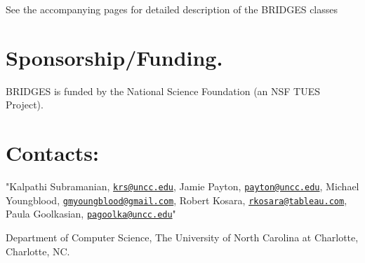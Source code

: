 See the accompanying pages for detailed description of the B\+R\+I\+D\+G\+ES classes \hypertarget{index_sponsor_sec}{}\section{Sponsorship/\+Funding.}\label{index_sponsor_sec}
B\+R\+I\+D\+G\+ES is funded by the National Science Foundation (an N\+SF T\+U\+ES Project).\hypertarget{index_contacts_sec}{}\section{Contacts\+:}\label{index_contacts_sec}
"Kalpathi Subramanian, \href{mailto:krs@uncc.edu}{\tt krs@uncc.\+edu}, Jamie Payton, \href{mailto:payton@uncc.edu}{\tt payton@uncc.\+edu}, Michael Youngblood, \href{mailto:gmyoungblood@gmail.com}{\tt gmyoungblood@gmail.\+com}, Robert Kosara, \href{mailto:rkosara@tableau.com}{\tt rkosara@tableau.\+com}, Paula Goolkasian, \href{mailto:pagoolka@uncc.edu}{\tt pagoolka@uncc.\+edu}"

Department of Computer Science, The University of North Carolina at Charlotte, Charlotte, NC. 